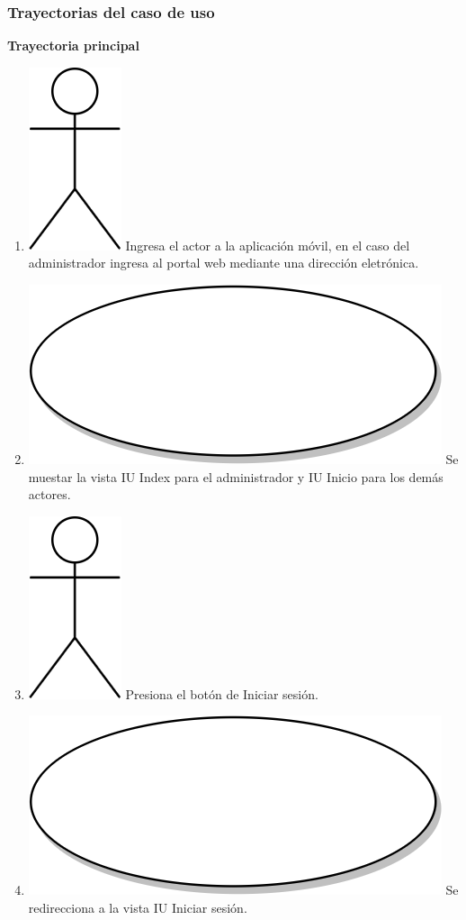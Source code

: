 \subsubsection{Trayectorias del caso de uso}
\textbf{Trayectoria principal}
\begin{enumerate}
  \item {\includegraphics[scale=.1]{Capitulo3/img/actor.png} Ingresa el actor a la aplicación móvil, en el caso del administrador ingresa al portal web mediante una dirección eletrónica.}
  \item {\includegraphics[scale=.05]{Capitulo3/img/proceso.png} Se muestar la vista IU Index para el administrador y IU Inicio para los demás actores.}
  \item {\includegraphics[scale=.1]{Capitulo3/img/actor.png} Presiona el botón de Iniciar sesión.}
  \item {\includegraphics[scale=.05]{Capitulo3/img/proceso.png} Se redirecciona a la vista IU Iniciar sesión.}

\end{enumerate}
